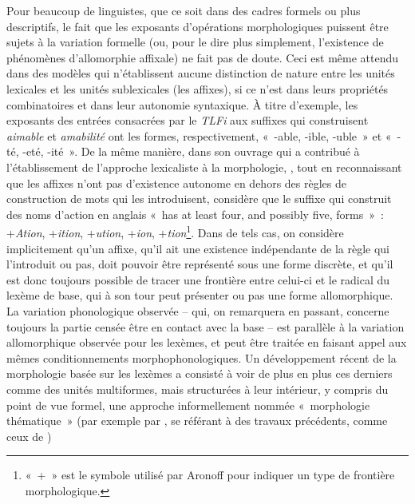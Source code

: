 \documentclass[output=paper]{langsci/langscibook}
\begin{document}
Pour beaucoup de linguistes, que ce soit dans des cadres formels ou plus
descriptifs, le fait que les exposants d'opérations morphologiques
puissent être sujets à la variation formelle (ou, pour le dire plus
simplement, l'existence de phénomènes d'allomorphie affixale) ne fait
pas de doute. Ceci est même attendu dans des modèles qui n'établissent
aucune distinction de nature entre les unités lexicales et les unités
sublexicales (les affixes), si ce n'est dans leurs propriétés
combinatoires et dans leur autonomie syntaxique. À titre d'exemple, les
exposants des entrées consacrées par le \emph{TLFi} aux suffixes qui
construisent \emph{aimable} et \emph{amabilité} ont les formes,
respectivement, «~-able, -ible, -uble~» et «~-té, -eté, -ité~». De la
même manière, dans son ouvrage qui a contribué à l'établissement de
l'approche lexicaliste à la morphologie, %
\citet[100]{Aronoff1976}%
%
, tout en
reconnaissant que les affixes n'ont pas d'existence autonome en dehors
des règles de construction de mots qui les introduisent, considère que
le suffixe qui construit des noms d'action en anglais «~has at least
four, and possibly five, forms~»~: +\emph{Ation}, +\emph{ition},
+\emph{ution}, +\emph{ion}, +\emph{tion}\footnote{«~+~» est le symbole
  utilisé par Aronoff pour indiquer un type de frontière morphologique.}.
Dans de tels cas, on considère implicitement qu'un affixe, qu'il ait une
existence indépendante de la règle qui l'introduit ou pas, doit pouvoir
être représenté sous une forme discrète, et qu'il est donc toujours
possible de tracer une frontière entre celui-ci et le radical du lexème
de base, qui à son tour peut présenter ou pas une forme allomorphique.
La variation phonologique observée -- qui, on remarquera en passant,
concerne toujours la partie censée être en contact avec la base -- est
parallèle à la variation allomorphique observée pour les lexèmes, et
peut être traitée en faisant appel aux mêmes conditionnements
morphophonologiques. Un développement récent de la morphologie basée sur
les lexèmes a consisté à voir de plus en plus ces derniers comme des
unités multiformes, mais structurées à leur intérieur, y compris du
point de vue formel, une approche informellement nommée «~morphologie
thématique~» %
(par exemple par \citealt{Plenat2008b}, se référant à des travaux précédents, comme ceux de \citealt{Bonami03a})%
\end{document}
